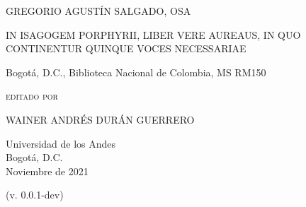 



\usepackage{draftwatermark}
\SetWatermarkFontSize{3.5cm}





\pagestyle{empty}

\begin{center}
\LARGE
\MakeUppercase{Gregorio Agustín Salgado, OSA}

\vfill

\Large
\MakeUppercase{In Isagogem Porphyrii, liber vere aureaus, in quo continentur quinque voces necessariae}

\bigskip

\normalsize
Bogotá, D.C., Biblioteca Nacional de Colombia, MS RM150

\vfill

\small
\textsc{editado por}

\bigskip

\Large

\MakeUppercase{Wainer Andrés Durán Guerrero}

\vfill

\normalsize
Universidad de los Andes \\

Bogotá, D.C. \\

Noviembre de 2021 \\

\scriptsize

(v. 0.0.1-dev)

\end{center}


\cleardoublepage


\pagestyle{fancy}
\fancyhead{}
\fancyfoot[C]{\thepage}
\renewcommand*{\contentsname}{Index generalis}
\tableofcontents


\fancyhead{}
\fancyfoot[C]{\thepage}

\cleardoublepage



